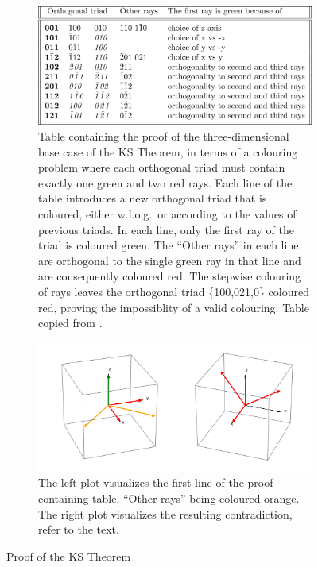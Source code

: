 \begin{figure}
\centering
\begin{subfigure}{\textwidth}
\centering
 \includegraphics[width=\textwidth]{images/perestable.png}
 \caption{Table containing the proof of the three-dimensional base case of the KS Theorem, in terms of a colouring problem where each orthogonal triad must contain exactly one green and two red rays. Each line of the table introduces a new orthogonal triad that is coloured, either w.l.o.g.\ or according to the values of previous triads. In each line, only the first ray of the triad is coloured green. The ``Other rays'' in each line are orthogonal to the single green ray in that line and are consequently coloured red. The stepwise colouring of rays leaves the orthogonal triad \{100,021,0\} coloured red, proving the impossiblity of a valid colouring. Table copied from \cite{Peres1991}.}
 \label{fig:table}
\end{subfigure}
\hfill\break
\begin{subfigure}{\textwidth}
\centering
\includegraphics[width=\textwidth]{images/triads.png}
\caption{The left plot visualizes the first line of the proof-containing table, ``Other rays'' being coloured orange. The right plot visualizes the resulting contradiction, refer to the text.}
\label{fig:triads}
\end{subfigure}
\caption{Proof of the KS Theorem}
\label{fig:ksproof}
\end{figure}

